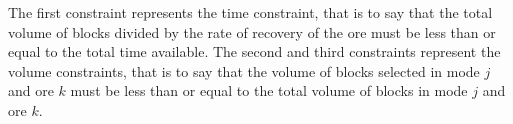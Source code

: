 \documentclass[11pt]{article}
\begin{document}
\noindent The first constraint represents the time constraint, that is to say that the total volume of blocks divided by the rate of recovery of the ore must be less than or equal to the total time available. The second and third constraints represent the volume constraints, that is to say that the volume of blocks selected in mode $j$ and ore $k$ must be less than or equal to the total volume of blocks in mode $j$ and ore $k$.\\
\end{document}
